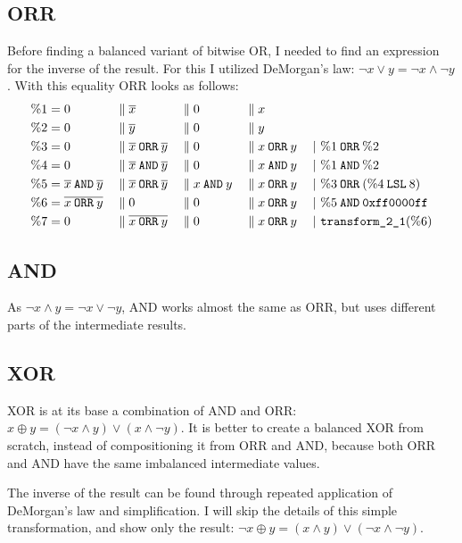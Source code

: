 \subsection{ORR}
Before finding a balanced variant of bitwise OR, I needed to find an expression for the inverse of the result.
For this I utilized DeMorgan's law: $\neg{x \lor y} = \neg{x} \land \neg{y}$.
With this equality ORR looks as follows:
\begin{align*}
  \%1 &= 0 &&\; \| \; \overline{x} &&\; \| \; 0 &&\; \| \; x &&\\
  \%2 &= 0 &&\; \| \; \overline{y} &&\; \| \; 0 &&\; \| \; y &&\\
  \%3 &= 0 &&\; \| \; \overline{x} \mathbin{\texttt{ORR}} \overline{y} &&\; \| \; 0 &&\; \| \; x \mathbin{\texttt{ORR}} y && \;|\ \%1 \mathbin{\texttt{ORR}} \%2\\
  \%4 &= 0 &&\; \| \; \overline{x} \mathbin{\texttt{AND}} \overline{y} &&\; \| \; 0 &&\; \| \; x \mathbin{\texttt{AND}} y && \;|\ \%1 \mathbin{\texttt{AND}} \%2\\
  \%5 &= \overline{x} \mathbin{\texttt{AND}} \overline{y} &&\; \| \; \overline{x} \mathbin{\texttt{ORR}} \overline{y} &&\; \| \; x \mathbin{\texttt{AND}} y &&\; \| \; x \mathbin{\texttt{ORR}} y && \;|\ \%3 \mathbin{\texttt{ORR}} (\%4 \mathbin{\texttt{LSL}} 8)\\
  \%6 &= \overline{x \mathbin{\texttt{ORR}} y} &&\; \| \; 0 &&\; \| \; 0 &&\; \| \; x \mathbin{\texttt{ORR}} y && \;|\ \%5 \mathbin{\texttt{AND}} \texttt{0xff0000ff}\\
  \%7 &= 0 &&\; \| \; \overline{x \mathbin{\texttt{ORR}} y} &&\; \| \; 0 &&\; \| \; x \mathbin{\texttt{ORR}} y && \;|\ \texttt{transform\_2\_1}(\%6)
\end{align*}

\subsection{AND}
As $\neg{x \land y} = \neg{x} \lor \neg{y}$, AND works almost the same as ORR, but uses different parts of the intermediate results.

\subsection{XOR}
XOR is at its base a combination of AND and ORR: $x \oplus y = (\neg{x} \land y) \lor (x \land \neg{y})$.
It is better to create a balanced XOR from scratch, instead of compositioning it from ORR and AND, because both ORR and AND have the same imbalanced intermediate values.

The inverse of the result can be found through repeated application of DeMorgan's law and simplification.
I will skip the details of this simple transformation, and show only the result: $\neg{x \oplus y} = (x \land y) \lor (\neg{x} \land \neg{y})$.

